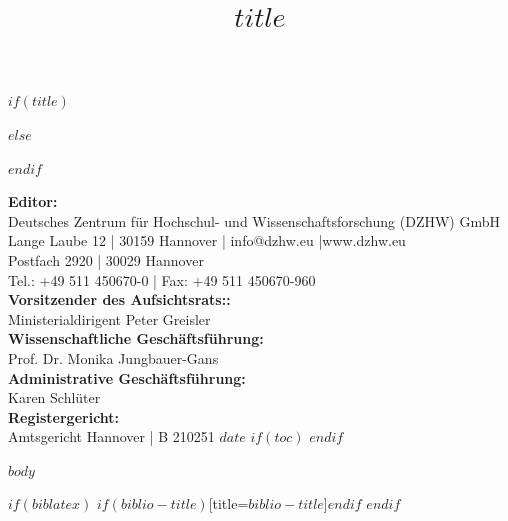\documentclass[a4paper,10pt]{article}
\begin{document}
$if(title)$
\title{$title$}
$else$
\title{}
$endif$
\date{} %
\maketitle\thispagestyle{empty}
\newpage
\thispagestyle{empty}
\null\vfill
\footnotesize
\noindent\textbf{Editor:}\\
Deutsches Zentrum für Hochschul- und Wissenschaftsforschung (DZHW) GmbH\\
Lange Laube 12 | 30159 Hannover | info@dzhw.eu |www.dzhw.eu\\
Postfach 2920 | 30029 Hannover\\
Tel.: +49 511 450670-0 | Fax: +49 511 450670-960\\
\textbf{Vorsitzender des Aufsichtsrats::}\\
Ministerialdirigent Peter Greisler\\
\textbf{Wissenschaftliche Geschäftsführung:}\\
Prof. Dr. Monika Jungbauer-Gans\\
\textbf{Administrative Geschäftsführung:}\\
Karen Schlüter\\
\textbf{Registergericht:}\\
Amtsgericht Hannover | B 210251
$date$
$if(toc)$
\newpage
\thispagestyle{empty}
\normalsize
{
\hypersetup{linkcolor=black}
\setcounter{tocdepth}{$toc-depth$}
\tableofcontents
}
$endif$

\newpage
\clearpage
\setcounter{page}{1}
$body$

$if(biblatex)$
\newpage
\printbibliography$if(biblio-title)$[title=$biblio-title$]$endif$
$endif$
\end{document}
